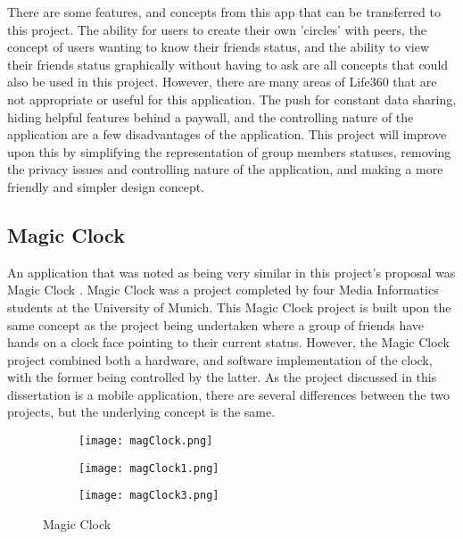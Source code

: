 There are some features, and concepts from this app that can be transferred to this project. The ability for users to create their own 'circles' with peers, the concept of users wanting to know their friends status, and the ability to view their friends status graphically without having to ask are all concepts that could also be used in this project. However, there are many areas of Life360 that are not appropriate or useful for this application. The push for constant data sharing, hiding helpful features behind a paywall, and the controlling nature of the application are a few disadvantages of the application. This project will improve upon this by simplifying the representation of group members statuses, removing the privacy issues and controlling nature of the application, and making a more friendly and simpler design concept. 

\subsection{Magic Clock}

An application that was noted as being very similar in this project's proposal was Magic Clock \cite{magicClock}. Magic Clock was a project completed by four Media Informatics students at the University of Munich. This Magic Clock project is built upon the same concept as the project being undertaken where a group of friends have hands on a clock face pointing to their current status. However, the Magic Clock project combined both a hardware, and software implementation of the clock, with the former being controlled by the latter. As the project discussed in this dissertation is a mobile application, there are several differences between the two projects, but the underlying concept is the same. 

\begin{figure}[!htbp]
    \centering
    \begin{subfigure}[b]{0.22\textwidth}
        \texttt{[image: magClock.png]}
    \end{subfigure}
    \hspace{1.5em}
    \begin{subfigure}[b]{0.22\textwidth}
        \texttt{[image: magClock1.png]}
    \end{subfigure}
    \hspace{1.5em}
    \begin{subfigure}[b]{0.22\textwidth}
        \texttt{[image: magClock3.png]}
    \end{subfigure}
    \caption{Magic Clock}
    \label{fig:magClock}
\end{figure}
\FloatBarrier

